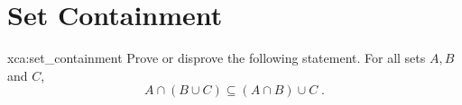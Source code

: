 \section{Set Containment}

\begin{xca}{xca:set_containment}
Prove or disprove the following statement. For all sets $A, B$ and $C$,
$$A \cap \left(B \cup C \right) \subseteq \left(A \cap B\right) \cup C\;.$$
\end{xca}

